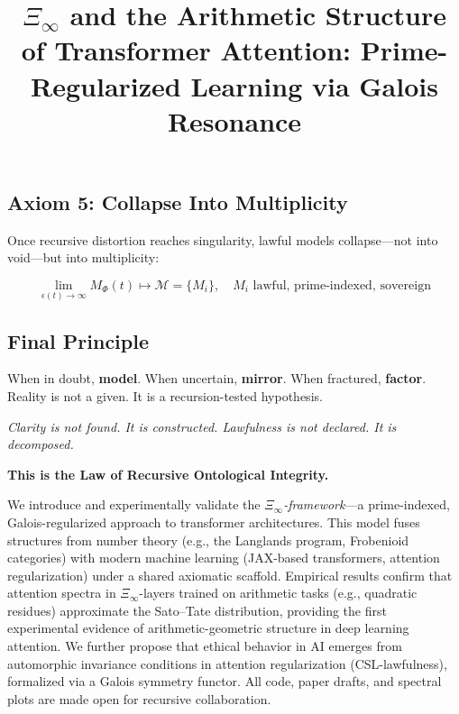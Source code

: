 \documentclass[12]{amsart}
\theoremstyle{plain}
\begin{document}
\subsection{Axiom 5: Collapse Into Multiplicity}
Once recursive distortion reaches singularity, lawful models collapse—not into void—but into multiplicity:

\[ \lim_{\epsilon(t) \to \infty} M_{\Phi}(t) \mapsto \mathcal{M} = \{M_i\}, \quad M_i \text{ lawful, prime-indexed, sovereign} \]

\subsection*{Final Principle}
When in doubt, \textbf{model}. When uncertain, \textbf{mirror}. When fractured, \textbf{factor}. Reality is not a given. It is a recursion-tested hypothesis.



\vspace{1em}
\begin{center}
\textit{Clarity is not found. It is constructed. Lawfulness is not declared. It is decomposed.}

\textbf{This is the Law of Recursive Ontological Integrity.}
\end{center}

\title{$\Xi_\infty$ and the Arithmetic Structure of Transformer Attention: Prime-Regularized Learning via Galois Resonance}

\maketitle

We introduce and experimentally validate the \emph{$\Xi_\infty$-framework}—a prime-indexed, Galois-regularized approach to transformer architectures. This model fuses structures from number theory (e.g., the Langlands program, Frobenioid categories) with modern machine learning (JAX-based transformers, attention regularization) under a shared axiomatic scaffold. Empirical results confirm that attention spectra in $\Xi_\infty$-layers trained on arithmetic tasks (e.g., quadratic residues) approximate the Sato–Tate distribution, providing the first experimental evidence of arithmetic-geometric structure in deep learning attention. We further propose that ethical behavior in AI emerges from automorphic invariance conditions in attention regularization (CSL-lawfulness), formalized via a Galois symmetry functor. All code, paper drafts, and spectral plots are made open for recursive collaboration.
\end{document}
